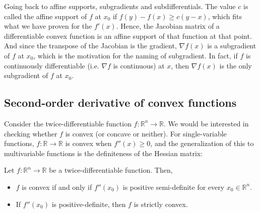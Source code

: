 Going back to affine supports, subgradients and subdifferentials. The value \( c
\) is called the affine support of \( f \) at \( x_{0} \) if \( f(y)-f(x)\ge c(y -
x) \), which fits what we have proven for the \( f'(x) \). Hence, the Jacobian
matrix of a differentiable convex function is an affine support of that function
at that point. And since the transpose of the Jacobian is the gradient, \(
\nabla f(x) \) is a subgradient of \( f \) at \( x_{0} \), which is the
motivation for the naming of subgradient. In fact, if \( f \) is continuously
differentiable (i.e. \( \nabla f \) is continuous) at \( x \), then \( \nabla
f(x) \) is the only subgradient of \( f \) at \( x_{0} \).


\subsection{Second-order derivative of convex functions} %
\label{sub:Second-order derivative of convex functions}

Consider the twice-differentiable function \( f: \mathbb{R}^{n} \to \mathbb{R}
\). We would be interested in checking whether \( f \) is convex (or concave or
neither). For single-variable functions, \( f: \mathbb{R} \to \mathbb{R} \) is
convex when \( f''(x) \ge 0 \), and the generalization of this to multivariable
functions is the definiteness of the Hessian matrix:

\begin{theorem}
\label{thr:Second derivative convex test}
  Let \( f: \mathbb{R}^{n} \to \mathbb{R} \) be a twice-differentiable function.
  Then,
  \begin{itemize}
  \item \( f \) is convex if and only if \( f''(x_{0}) \) is
    positive semi-definite for every \( x_{0} \in \mathbb{R}^{n} \).
  \item If \( f''(x_{0}) \) is positive-definite, then \( f \) is
    strictly convex.
  \end{itemize}
\end{theorem}

